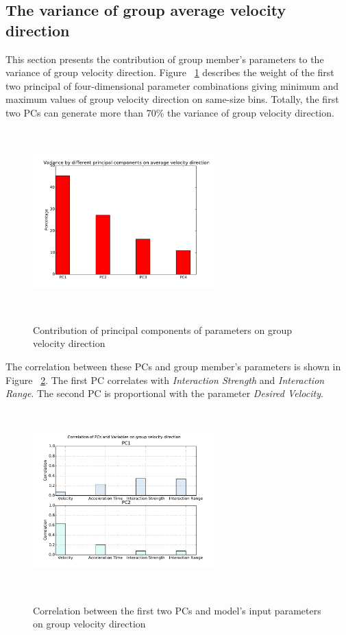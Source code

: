 \documentclass[a4paper,11pt,phdthesis,singlespace,twoside]{cssethesis}
\begin{document}
\subsection{The variance of group average velocity direction}
This section presents the contribution of group member's parameters to the variance of group velocity direction. Figure ~\ref{fig:pc_a_d} describes the weight of the first two principal of four-dimensional parameter combinations giving minimum and maximum values of group velocity direction on same-size bins. Totally, the first two PCs can generate more than 70\% the variance of group velocity direction.    
\begin{figure}[H]
\begin{center}
{\includegraphics[width=7cm,height=7cm]{figs/pc_a_d.pdf}}
\end{center}
\caption{Contribution of principal components of parameters on group velocity direction}
\label{fig:pc_a_d}
\end{figure}
The correlation between these PCs and group member's parameters is shown in Figure ~\ref{fig:pca_corr_group_direction}. The first PC correlates with \textit{Interaction Strength} and \textit{Interaction Range}. The second PC is proportional with the parameter \textit{Desired Velocity}.
\begin{figure}[H]
\begin{center}
{\includegraphics[width=7cm,height=7cm]{figs/pca_corr_group_direction.pdf}}
\end{center}
\caption{Correlation between the first two PCs and model's input parameters on group velocity direction}
\label{fig:pca_corr_group_direction}
\end{figure}
\end{document}

